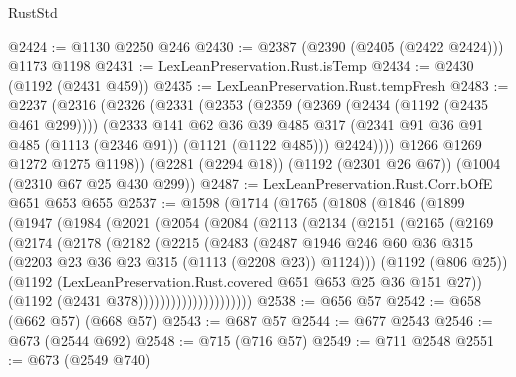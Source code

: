 \begin{lexlean}{RustStd}
\begin{coremodule}
{\begin{coremodule}
{{{{{{{{{{@2424 := @1130 @2250 @246
@2430 := @2387 (@2390 (@2405 (@2422 @2424))) @1173 @1198
@2431 := LexLeanPreservation.Rust.isTemp
@2434 := @2430 (@1192 (@2431 @459))
@2435 := LexLeanPreservation.Rust.tempFresh
@2483 := @2237
    (@2316
      (@2326
        (@2331
          (@2353
            (@2359
              (@2369 (@2434 (@1192 (@2435 @461 @299))))
              (@2333
                @141
                @62
                @36
                @39
                @485
                @317
                (@2341 @91 @36 @91 @485 (@1113 (@2346 @91)) (@1121 (@1122 @485)))
                @2424))))
        @1266
        @1269
        @1272
        @1275
        @1198))
    (@2281 (@2294 @18))
    (@1192 (@2301 @26 @67))
    (@1004 (@2310 @67 @25 @430 @299))
@2487 := LexLeanPreservation.Rust.Corr.bOfE @651 @653 @655
@2537 := @1598
    (@1714
      (@1765
        (@1808
          (@1846
            (@1899
              (@1947
                (@1984
                  (@2021
                    (@2054
                      (@2084
                        (@2113
                          (@2134
                            (@2151
                              (@2165
                                (@2169
                                  (@2174
                                    (@2178
                                      (@2182
                                        (@2215
                                          (@2483
                                            (@2487
                                              @1946
                                              @246
                                              @60
                                              @36
                                              @315
                                              (@2203 @23 @36 @23 @315 (@1113 (@2208 @23)) @1124)))
                                          (@1192 (@806 @25))
                                          (@1192
                                            (LexLeanPreservation.Rust.covered
                                              @651
                                              @653
                                              @25
                                              @36
                                              @151
                                              @27))
                                          (@1192 (@2431 @378)))))))))))))))))))))
@2538 := @656 @57
@2542 := @658 (@662 @57) (@668 @57)
@2543 := @687 @57
@2544 := @677 @2543
@2546 := @673 (@2544 @692)
@2548 := @715 (@716 @57)
@2549 := @711 @2548
@2551 := @673 (@2549 @740)
}}}}}}}}}}
\end{coremodule}}
\end{coremodule}
\end{lexlean}
